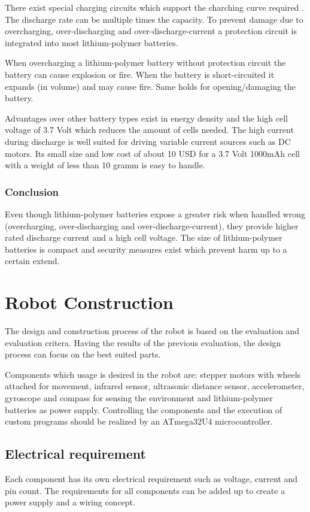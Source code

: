 There exist special charging circuits which support the charching curve required . The discharge rate can be multiple times the capacity.
To prevent damage due to overcharging, over-discharging and over-discharge-current a protection circuit is integrated into most lithium-polymer batteries.

When overcharging a lithium-polymer battery without protection circuit the battery can cause explosion or fire. When the battery is short-circuited it expands (in volume) and may cause fire. Same holds for opening/damaging the battery. 

Advantages over other battery types exist in energy density and the high cell voltage of 3.7 Volt which reduces the amount of cells needed. The high current during discharge is well suited for driving variable current sources such as DC motors. Its small size and low cost of about 10 USD for a 3.7 Volt 1000mAh cell with a weight of less than 10 gramm is easy to handle.
\subsection{Conclusion}
Even though lithium-polymer batteries expose a greater risk when handled wrong (overcharging, over-discharging and over-discharge-current), they provide higher rated discharge current and a high cell voltage. The size of lithium-polymer batteries is compact and security measures  exist which prevent harm up to a certain extend.
\chapter{Robot Construction}
The design and construction process of the robot is based on the evaluation and evaluation critera. Having the results of the previous evaluation, the design process can focus on the best suited parts.

Components which usage is desired in the robot are: stepper motors with wheels attached for movement, infrared sensor, ultrasonic distance sensor, accelerometer, gyroscope and compass for sensing the environment and lithium-polymer batteries as power supply. Controlling the components and the execution of custom programs should be realized by an ATmega32U4 microcontroller.

\section{Electrical requirement}
Each component has its own electrical requirement such as voltage, current and pin count. The requirements for all components can be added up to create a power supply and a wiring concept. 

